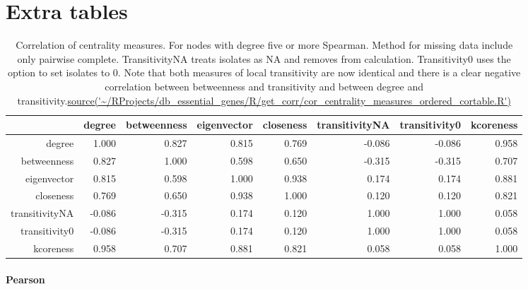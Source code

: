 \section{Extra tables}
\begin{table}[ht]
\centering
\begin{adjustbox}{width = \textwidth}
\begin{tabular}{rrrrrrrr}
  \hline
 & degree & betweenness & eigenvector & closeness & transitivityNA & transitivity0 & kcoreness \\ 
  \hline
degree & 1.000 & 0.827 & 0.815 & 0.769 & -0.086 & -0.086 & 0.958 \\ 
  betweenness & 0.827 & 1.000 & 0.598 & 0.650 & -0.315 & -0.315 & 0.707 \\ 
  eigenvector & 0.815 & 0.598 & 1.000 & 0.938 & 0.174 & 0.174 & 0.881 \\ 
  closeness & 0.769 & 0.650 & 0.938 & 1.000 & 0.120 & 0.120 & 0.821 \\ 
  transitivityNA & -0.086 & -0.315 & 0.174 & 0.120 & 1.000 & 1.000 & 0.058 \\ 
  transitivity0 & -0.086 & -0.315 & 0.174 & 0.120 & 1.000 & 1.000 & 0.058 \\ 
  kcoreness & 0.958 & 0.707 & 0.881 & 0.821 & 0.058 & 0.058 & 1.000 \\ 
   \hline
\end{tabular}
\end{adjustbox}
\caption[Correlation of centrality measures for nodes $k>=5$]{Correlation of centrality measures. For nodes with degree five or more Spearman. Method for missing data include only pairwise complete. TransitivityNA treats isolates as NA and removes from calculation. Transitivity0 uses the option to set isolates to 0. Note that both measures of local transitivity are now identical and there is a clear negative correlation between betweenness and transitivity and between degree and transitivity.\url{source('~/RProjects/db_essential_genes/R/get_corr/cor_centrality_measures_ordered_cortable.R')}} 
\label{tab:Correlation of centrality measures 2 transitvities deg five or more}
\end{table}
\paragraph{Pearson}

